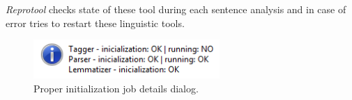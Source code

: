 \emph{Reprotool} checks state of these tool during each sentence analysis and in case of error tries to restart these linguistic tools.

\begin{figure}[ht]
  \centering
  \includegraphics[width=200pt]{images/manual-analysis/progress-initialization}
  \caption{Proper initialization job details dialog.}
  \label{fig:progress-initialization}
\end{figure}


 